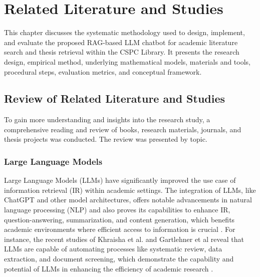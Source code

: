 \chapter{Related Literature and Studies}
\begin{refsection}
This chapter discusses the systematic methodology used to design, implement, and evaluate the proposed RAG-based LLM chatbot for academic literature search and thesis retrieval within the CSPC Library. It presents the research design, empirical method, underlying mathematical models, materials and tools, procedural steps, evaluation metrics, and conceptual framework.


\section{Review of Related Literature and Studies}
To gain more understanding and insights into the research study, a comprehensive reading and review of books, research materials, journals, and thesis projects was conducted. The review was presented by topic.

\subsection{Large Language Models}
\hspace{1cm}Large Language Models (LLMs) have significantly improved the use case of information retrieval (IR) within academic settings. The integration of LLMs, like ChatGPT and other model architectures, offers notable advancements in natural language processing (NLP) and also proves its capabilities to enhance IR, question-answering, summarization, and content generation, which benefits academic environments where efficient access to information is crucial \cite{yalamanchili2024quality} \cite{yang2023large}. For instance, the recent studies of Khraisha et al. and Gartlehner et al reveal that LLMs are capable of automating processes like systematic review, data extraction, and document screening, which demonstrate the capability and potential of LLMs in enhancing the efficiency of academic research \cite{khraisha2024can}  \cite{gartlehner2023data}.



\end{refsection}
